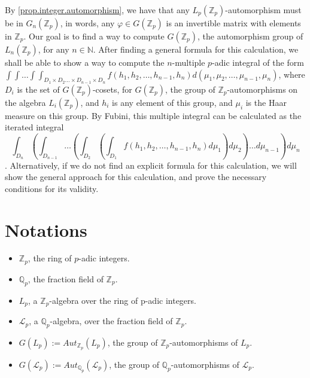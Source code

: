 \documentclass[12pt]{article}
\begin{document}
By \ref{prop.integer.automorphism}, we have that any $L_p(\mathbb{Z}_p)$-automorphism must be in $G_n(\mathbb{Z}_p)$, in words, any $\varphi\in G(\mathbb{Z}_p)$ is an invertible matrix with elements in $\mathbb{Z}_p$. Our goal is to find a way to compute $G(\mathbb{Z}_p)$, the automorphism group of $L_n(\mathbb{Z}_p)$, for any $n\in\mathbb{N}$. After finding a general formula for this calculation, we shall be able to show a way to compute the $n$-multiple $p$-adic integral of the form $\displaystyle\int\int\dots\int\int_{D_1\times D_2\dots\times D_{n-1}\times D_n}f(h_1,h_2,\dots,h_{n-1},h_n)d(\mu_1,\mu_2,\dots,\mu_{n-1},\mu_n)$, where $D_i$ is the set of $G(\mathbb{Z}_p)$-cosets, for $G(\mathbb{Z}_p)$, the group of $\mathbb{Z}_p$-automorphisms on the algebra $L_i(\mathbb{Z}_p)$, and $h_i$ is any element of this group, and $\mu_i$ is the Haar measure on this group. By Fubini, this multiple integral can be calculated as the iterated integral $$\displaystyle\int_{D_n}\left(\int_{D_{n-1}}\dots\left(\int_{D_2}\left(\int_{D_1}f(h_1,h_2,\dots,h_{n-1},h_n)d\mu_1\right)d\mu_2\right)\dots d\mu_{n-1}\right)d\mu_n$$. Alternatively, if we do not find an explicit formula for this calculation, we will show the general approach for this calculation, and prove the necessary conditions for its validity. 
\section{Notations}
\begin{itemize}
\item $\mathbb{Z}_p$, the ring of $p$-adic integers.
\item $\mathbb{Q}_p$, the fraction field of $\mathbb{Z}_p$.
\item $L_p$, a $\mathbb{Z}_p$-algebra over the ring of p-adic integers.
\item $\mathcal{L}_p$, a $\mathbb{Q}_p$-algebra, over the fraction field of $\mathbb{Z}_p$.
\item $G(L_p):=Aut_{\mathbb{Z}_p}(L_p)$, the group of $\mathbb{Z}_p$-automorphisms of $L_p$.
\item $G(\mathcal{L}_p):=Aut_{\mathbb{Q}_p}(\mathcal{L}_p)$, the group of $\mathbb{Q}_p$-automorphisms of $\mathcal{L}_p$.
\end{itemize}
\end{document}
